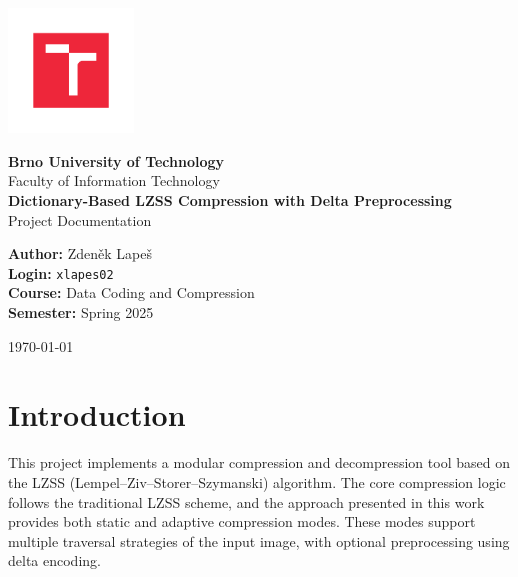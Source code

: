 \documentclass[a4paper,12pt]{article}
\begin{document}
    \begin{titlepage}
        \centering
        \vspace*{1cm}

        \includegraphics[width=0.25\textwidth]{template-fig/VUT_symbol_barevne_CMYK_CZ}\par\vspace{1cm} %

        {\Large\textbf{Brno University of Technology}}\\[0.5cm]
        {\large Faculty of Information Technology}\\[2cm]

        {\huge\bfseries Dictionary-Based LZSS Compression with Delta Preprocessing}\\[0.5cm]

        {\large Project Documentation}\\[2cm]

        \begin{flushleft}
            \textbf{Author:} Zdeněk Lapeš\\
            \textbf{Login:} \texttt{xlapes02}\\
            \textbf{Course:} Data Coding and Compression\\
            \textbf{Semester:} Spring 2025
        \end{flushleft}

        \vfill

        {\large \today}

    \end{titlepage}

    \tableofcontents
    \newpage



    \section{Introduction}

    This project implements a modular compression and decompression tool based on the LZSS (Lempel–Ziv–Storer–Szymanski) algorithm. The core compression logic follows the traditional LZSS scheme, and the approach presented in this work provides both static and adaptive compression modes. These modes support multiple traversal strategies of the input image, with optional preprocessing using delta encoding.
\end{document}
